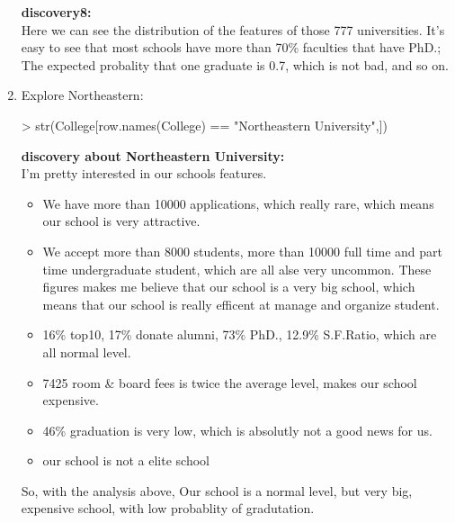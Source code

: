 \documentclass[a4paper]{article}
\begin{document}
\begin{enumerate}
{
\colorbox{BurntOrange}{\textbf{discovery8:}}\color{red}\\
Here we can see the distribution of the features of those 777 universities. It's easy to see that most schools have more than 70\% faculties that have PhD.; The expected probality that one graduate is 0.7, which is not bad, and so on.
}


\item Explore Northeastern:
\begin{Schunk}
\begin{Sinput}
> str(College[row.names(College) == "Northeastern University",])
\end{Sinput}
\end{Schunk}

{
\colorbox{BurntOrange}{\textbf{discovery about Northeastern University:}}\color{red}\\
I'm pretty interested in our schools features.
\begin{itemize}
\item We have more than 10000 applications, which really rare, which means our school is very attractive.
\item We accept more than 8000 students, more than 10000 full time and part time undergraduate student, which are all alse very uncommon. These figures makes me believe that our school is a very big school, which means that our school is really efficent at manage and organize student.
\item 16\% top10, 17\% donate alumni, 73\% PhD., 12.9\% S.F.Ratio, which are all normal level.
\item 7425 room \& board fees is twice the average level, makes our school expensive.
\item 46\% graduation is very low, which is absolutly not a good news for us.
\item our school is not a elite school
\end{itemize}
So, with the analysis above, Our school is a normal level, but very big, expensive school, with low probablity of gradutation.

}
\end{enumerate}
\end{document}
